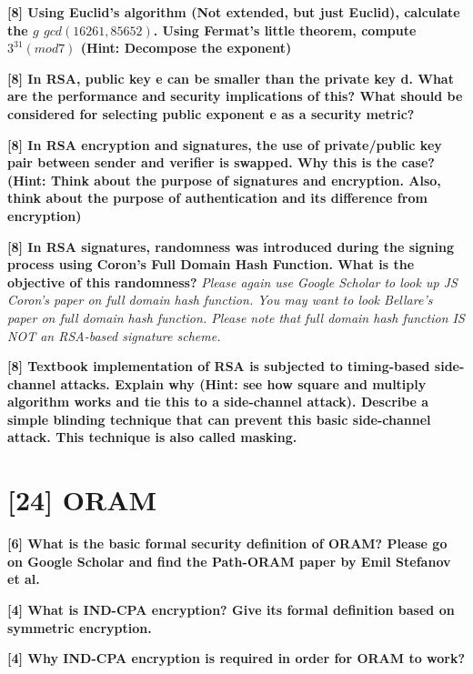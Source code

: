 \documentclass[letterpaper,11pt,notitlepage,fleqn]{article}
\begin{document}
\noindent \textbf{[8] Using Euclid’s algorithm (Not extended, but just Euclid), calculate the $g$ $gcd(16261,  85652)$.  Using  Fermat’s  little  theorem,  compute  $3^{31}  (mod  7)$  (Hint: Decompose the exponent)} 

\noindent \textbf{[8]  In  RSA,  public  key  e  can  be  smaller  than  the  private  key  d.  What  are  the performance  and  security  implications  of  this?  What  should  be  considered  for selecting public exponent e as a security metric?}

\noindent \textbf{[8]  In  RSA  encryption  and  signatures,  the  use  of  private/public  key  pair  between sender  and  verifier  is  swapped.  Why  this  is  the  case?  (Hint:  Think  about  the purpose  of  signatures  and  encryption.  Also,  think  about  the  purpose  of authentication and its difference from encryption)}

\noindent \textbf{[8]  In  RSA  signatures,  randomness  was  introduced  during  the  signing  process using  Coron’s  Full  Domain  Hash  Function.  What  is  the  objective  of  this randomness?} \textit{Please again use Google Scholar to look up JS Coron’s paper on full domain hash  function. You may want  to  look Bellare’s paper on  full domain hash function.  Please  note  that  full  domain  hash  function  IS  NOT  an  RSA-based signature scheme.}

\noindent \textbf{[8]  Textbook  implementation  of  RSA    is  subjected  to  timing-based  side-channel attacks. Explain why  (Hint:  see how  square  and multiply  algorithm works  and  tie this  to  a  side-channel  attack).  Describe  a  simple  blinding  technique  that  can prevent this basic side-channel attack. This technique is also called masking.}
 
 
\section{[24] ORAM}
 
 
 
\noindent \textbf{[6] What is the basic formal security definition of ORAM? Please go on Google Scholar and find the Path-ORAM paper by Emil Stefanov et al.} 
 
 
 
\noindent \textbf{[4] What is IND-CPA encryption? Give its formal definition based on symmetric encryption.}
 
 
 
\noindent \textbf{[4] Why IND-CPA encryption is required in order for ORAM to work?}
 
\end{document}
